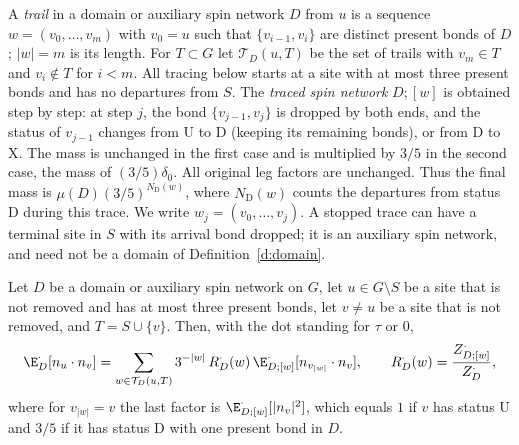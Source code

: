 A \emph{trail} in a domain or auxiliary spin network $D$ from $u$ is a
sequence $w=(v_0,\dots,v_m)$ with $v_0=u$ such that
$\{v_{i-1},v_i\}$ are distinct present bonds of $D$; $|w|=m$ is its
length. For $T\subset G$ let $\mathcal T_D(u,T)$ be the set of trails
with $v_m\in T$ and $v_i\notin T$ for $i<m$. All tracing below starts
at a site with at most three present bonds and has no departures from
$S$. The \emph{traced spin network} $D;[w]$ is obtained step by step:
at step $j$, the bond $\{v_{j-1},v_j\}$ is dropped by both ends, and
the status of $v_{j-1}$ changes from $\mathrm U$ to $\mathrm D$
(keeping its remaining bonds), or from $\mathrm D$ to $\mathrm X$.
The mass is unchanged in the first case and is multiplied by $3/5$ in
the second case, the mass of $(3/5)\delta_0$. All original leg factors
are unchanged. Thus the final mass is
$\mu(D)(3/5)^{N_{\mathrm D}(w)}$, where $N_{\mathrm D}(w)$ counts
the departures from status $\mathrm D$ during this trace. We write
$w_j=(v_0,\dots,v_j)$. A stopped trace can have a terminal site in
$S$ with its arrival bond dropped; it is an auxiliary spin network,
and need not be a domain of Definition~\ref{d:domain}.

\begin{proposition}\label{p:pairwalk}
Let $D$ be a domain or auxiliary spin network on $G$, let
$u\in G\setminus S$ be a site that is not removed and has at most
three present bonds, let $v\ne u$ be a site that is not removed, and
$T=S\cup\{v\}$. Then, with the dot standing for $\tau$ or $0$,
\begin{equation}\label{e:pairwalk}
\E^\cdot_D[n_u \cdot n_v] = \sum_{w \in \mathcal T_D(u, T)} 3^{-|w|} \, R^\cdot_D(w) \, \E^\cdot_{D;[w]}[n_{v_{|w|}} \cdot n_v], \qquad R^\cdot_D(w) = \frac{Z^\cdot_{D;[w]}}{Z^\cdot_D},
\end{equation}
where for $v_{|w|} = v$ the last factor is $\E^\cdot_{D;[w]} [|n_v|^2]$, which equals $1$ if $v$ has status $\mathrm U$ and $3/5$ if it has status $\mathrm D$ with one present bond in $D$.
\end{proposition}

